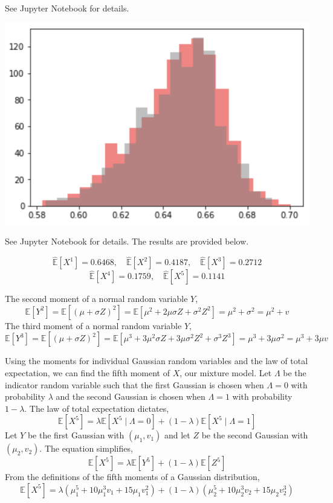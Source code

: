 \documentclass[12pt,twoside]{article}
\begin{document}
\begin{problems}
\begin{problemparts}
See Jupyter Notebook for details.

\begin{center}
    \includegraphics[scale=0.75]{PS1P3E.png}
\end{center}

\problempart %

See Jupyter Notebook for details. The results are provided below.

$$ \hat{\mathbb{E}}[X^1] = 0.6468,\quad \hat{\mathbb{E}}[X^2] = 0.4187,\quad
\hat{\mathbb{E}}[X^3] = 0.2712 $$
$$ \hat{\mathbb{E}}[X^4] = 0.1759,\quad \hat{\mathbb{E}}[X^5] = 0.1141 $$

\problempart %

The second moment of a normal random variable $Y$,
$$ \mathbb{E}[Y^2] = \mathbb{E}[(\mu + \sigma Z)^2] = \mathbb{E}[\mu^2 + 2 \mu 
\sigma Z  + \sigma^2 Z^2] = \mu^2 + \sigma^2 = \mu^2 + v $$
The third moment of a normal random variable $Y$,
$$ \mathbb{E}[Y^3] = \mathbb{E}[(\mu + \sigma Z)^2] = \mathbb{E}[\mu^3 + 3 
\mu^2 \sigma Z + 3 \mu \sigma^2 Z^2 + \sigma^3 Z^3] = \mu^3 + 3 \mu \sigma^2 =
\mu^3 + 3 \mu v $$

Using the moments for individual Gaussian random variables and the law of
total expectation, we can find the fifth moment of $X$, our mixture model. 
Let $\Lambda$ be the indicator random variable such that the first Gaussian 
is chosen when $\Lambda = 0$ with probability $\lambda$ and the second 
Gaussian is chosen when $\Lambda = 1$ with probability $1 - \lambda$. The
law of total expectation dictates,
$$ \mathbb{E}[X^5] = \lambda \mathbb{E}[X^5 \mid \Lambda = 0] + (1 - 
\lambda) \mathbb{E}[X^5 \mid \Lambda = 1] $$
Let $Y$ be the first Gaussian with $(\mu_1, v_1)$ and let $Z$ be the second
Gaussian with $(\mu_2, v_2)$. The equation simplifies,
$$ \mathbb{E}[X^5] = \lambda \mathbb{E}[Y^5] + (1 - \lambda) \mathbb{E}[Z^5] $$
From the definitions of the fifth moments of a Gaussian distribution,
$$ \mathbb{E}[X^5] = \lambda (\mu_1^5 + 10 \mu_1^3 v_1 + 15 \mu_1 v_1^2) + (1
- \lambda) (\mu_2^5 + 10 \mu_2^3 v_2 + 15 \mu_2 v_2^3) $$


\end{problemparts}
\end{problems}
\end{document}
